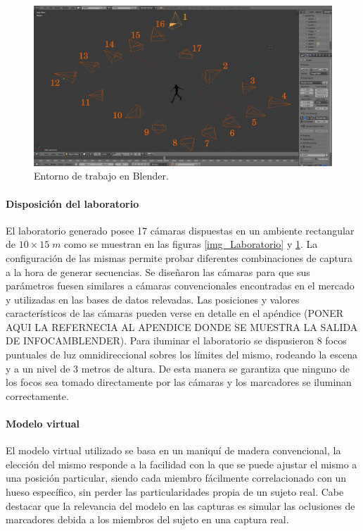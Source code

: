 \begin{figure}[!ht]
  \centering 
   \includegraphics[scale=0.3]{img/Base_Datos/Entorno_Blender.pdf}
   \caption{Entorno de trabajo en Blender.}
  \label{img_Entorno_Blender}
\end{figure}   


\paragraph{Disposición del laboratorio}
El laboratorio generado posee 17 cámaras dispuestas en un ambiente rectangular de $10\times15\;m $ como se muestran en las figuras \ref{img_Laboratorio} y \ref{img_Entorno_Blender}. La configuración de las mismas permite probar diferentes combinaciones de captura a la hora de generar secuencias. Se diseñaron las cámaras para que sus parámetros fuesen similares a cámaras convencionales
 encontradas en el mercado y utilizadas en las bases de datos relevadas. 
 Las posiciones y valores característicos de las cámaras pueden verse en detalle en el apéndice  
 (PONER AQUI LA REFERNECIA AL APENDICE DONDE SE MUESTRA LA SALIDA DE INFOCAMBLENDER). Para iluminar el laboratorio se dispusieron $8$ focos puntuales de luz omnidireccional sobres los límites del mismo, rodeando la escena y a un nivel de 3 metros de altura. De esta manera se garantiza que ninguno de los focos sea tomado directamente por las cámaras y los marcadores se iluminan correctamente.
 

\paragraph{Modelo virtual}  
El modelo virtual utilizado se basa en un maniquí de madera convencional, la elección del mismo responde a la facilidad con la que se puede ajustar el mismo a una posición particular, siendo cada miembro fácilmente correlacionado con un hueso específico, sin perder las particularidades propia de un sujeto real. Cabe destacar que la relevancia del modelo en las capturas es simular las oclusiones de marcadores debida a los miembros del sujeto en una captura real.  

